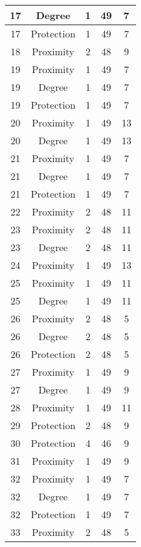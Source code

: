 \documentclass[results.tex]{subfiles}
\begin{document}
\begin{center}
\begin{tabular}{| c || c | c | c | c |}
    \hline
    17 & Degree & 1 & 49 & 7 \\ 
    \hline
    17 & Protection & 1 & 49 & 7 \\ 
    \hline
    18 & Proximity & 2 & 48 & 9 \\ 
    \hline
    19 & Proximity & 1 & 49 & 7 \\ 
    \hline
    19 & Degree & 1 & 49 & 7 \\ 
    \hline
    19 & Protection & 1 & 49 & 7 \\ 
    \hline
    20 & Proximity & 1 & 49 & 13 \\ 
    \hline
    20 & Degree & 1 & 49 & 13 \\ 
    \hline
    21 & Proximity & 1 & 49 & 7 \\ 
    \hline
    21 & Degree & 1 & 49 & 7 \\ 
    \hline
    21 & Protection & 1 & 49 & 7 \\ 
    \hline
    22 & Proximity & 2 & 48 & 11 \\ 
    \hline
    23 & Proximity & 2 & 48 & 11 \\ 
    \hline
    23 & Degree & 2 & 48 & 11 \\ 
    \hline
    24 & Proximity & 1 & 49 & 13 \\ 
    \hline
    25 & Proximity & 1 & 49 & 11 \\ 
    \hline
    25 & Degree & 1 & 49 & 11 \\ 
    \hline
    26 & Proximity & 2 & 48 & 5 \\ 
    \hline
    26 & Degree & 2 & 48 & 5 \\ 
    \hline
    26 & Protection & 2 & 48 & 5 \\ 
    \hline
    27 & Proximity & 1 & 49 & 9 \\ 
    \hline
    27 & Degree & 1 & 49 & 9 \\ 
    \hline
    28 & Proximity & 1 & 49 & 11 \\ 
    \hline
    29 & Protection & 2 & 48 & 9 \\ 
    \hline
    30 & Protection & 4 & 46 & 9 \\ 
    \hline
    31 & Proximity & 1 & 49 & 9 \\ 
    \hline
    32 & Proximity & 1 & 49 & 7 \\ 
    \hline
    32 & Degree & 1 & 49 & 7 \\ 
    \hline
    32 & Protection & 1 & 49 & 7 \\ 
    \hline
    33 & Proximity & 2 & 48 & 5 \\ 
    \hline

\end{tabular}
\end{center}
\end{document}
